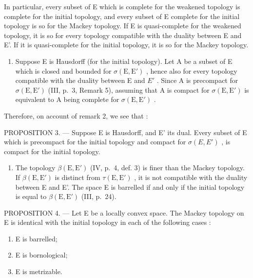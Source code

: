 In particular, every subset of E which is complete for the weakened topology is complete for the initial topology, and every subset of E complete for the initial topology is so for the Mackey topology. If E is quasi-complete for the weakened topology, it is so for every topology compatible with the duality between E and E'. If it is quasi-complete for the initial topology, it is so for the Mackey topology.

\begin{enumerate}
\def\labelenumi{\arabic{enumi})}
\setcounter{enumi}{2}
\tightlist
\item
  Suppose E is Hausdorff (for the initial topology). Let A be a subset of E which is closed and bounded for \(\sigma(\mathrm{E}, \mathrm{E}')\) , hence also for every topology compatible with the duality between E and \(E'\) . Since A is precompact for \(\sigma(\mathrm{E}, \mathrm{E}')\) (III, p.~3, Remark 5), assuming that A is compact for \(\sigma(\mathrm{E}, \mathrm{E}')\) is equivalent to A being complete for \(\sigma(\mathrm{E}, \mathrm{E}')\) .
\end{enumerate}

Therefore, on account of remark 2, we see that :

PROPOSITION 3. --- Suppose E is Hausdorff, and E' its dual. Every subset of E which is precompact for the initial topology and compact for \(\sigma(E, E')\) , is compact for the initial topology.

\begin{enumerate}
\def\labelenumi{\arabic{enumi})}
\setcounter{enumi}{3}
\tightlist
\item
  The topology \(\beta(\mathrm{E},\mathrm{E}')\) (IV, p.~4, def. 3) is finer than the Mackey topology. If \(\beta(\mathrm{E},\mathrm{E}')\) is distinct from \(\tau(\mathrm{E},\mathrm{E}')\) , it is not compatible with the duality between E and E'. The space E is barrelled if and only if the initial topology is equal to \(\beta(\mathrm{E},\mathrm{E}')\) (III, p.~24).
\end{enumerate}

PROPOSITION 4. --- Let E be a locally convex space. The Mackey topology on E is identical with the initial topology in each of the following cases :

\begin{enumerate}
\def\labelenumi{\alph{enumi})}
\item
  E is barrelled;
\item
  E is bornological;
\item
  E is metrizable.
\end{enumerate}

